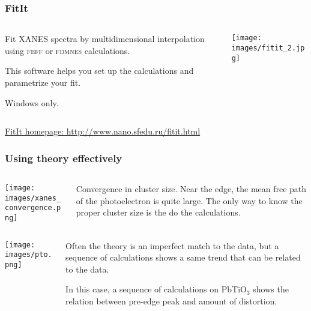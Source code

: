\documentclass[10pt, xcolor=x11names, compress]{beamer}
\begin{document}
\begin{frame}
  \frametitle{FitIt}
  \begin{columns}
    \begin{column}{0.5\linewidth}
      Fit XANES spectra by multidimensional interpolation using
      \textsc{feff} or \textsc{fdmnes} calculations.

      \smallskip

      This software helps you set up the calculations and parametrize
      your fit.

      \smallskip

      Windows only.
    \end{column}
    \begin{column}{0.5\linewidth}
      \texttt{[image: images/fitit\_2.jpg]}      
    \end{column}
  \end{columns}

  \bigskip

  \href{http://www.nano.sfedu.ru/fitit.html}
  {\color{Blue4}FitIt homepage: http://www.nano.sfedu.ru/fitit.html}
\end{frame}

\begin{frame}
  \frametitle{Using theory effectively}
  \begin{columns}
    \begin{column}{0.4\linewidth}
      \begin{center}
        \texttt{[image: images/xanes\_convergence.png]}
      \end{center}
    \end{column}
    \begin{column}{0.6\linewidth}
      Convergence in cluster size.  Near the edge, the mean free path
      of the photoelectron is quite large.  The only way to know the
      proper cluster size is the do the calculations.
    \end{column}
  \end{columns}

  \begin{columns}
    \begin{column}{0.4\linewidth}
      \begin{center}
        \texttt{[image: images/pto.png]}
      \end{center}
    \end{column}
    \begin{column}{0.6\linewidth}
      Often the theory is an imperfect match to the data, but a
      sequence of calculations shows a same trend that can be related
      to the data.

      In this case, a sequence of calculations on PbTiO$_3$ shows the
      relation between pre-edge peak and amount of distortion.
    \end{column}
  \end{columns}
\end{frame}
\end{document}
